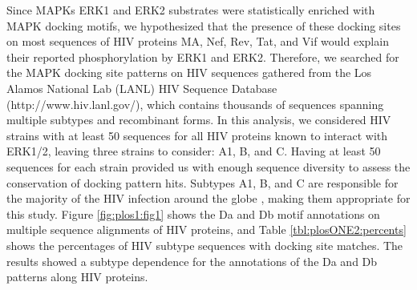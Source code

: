 

Since MAPKs ERK1 and ERK2 substrates were statistically enriched with MAPK
docking motifs, we hypothesized that the presence of these docking
sites on most sequences of HIV proteins MA, Nef, Rev, Tat, and Vif
would explain their reported phosphorylation by ERK1 and
ERK2. Therefore, we searched for the MAPK docking site patterns on HIV
sequences gathered from the Los Alamos National Lab (LANL) HIV
Sequence Database (http://www.hiv.lanl.gov/), which contains thousands
of sequences spanning multiple subtypes and recombinant forms. In this
analysis, we considered HIV strains with at least 50 sequences for all
HIV proteins known to interact with ERK1/2, leaving three strains to
consider: A1, B, and C. Having at least 50 sequences for each strain
provided us with enough sequence diversity to assess the conservation
of docking pattern hits. Subtypes A1, B, and C are responsible for the
majority of the HIV infection around the globe \cite{hemelarr06},
making them appropriate for this study. Figure \ref{fig:plos1:fig1}
shows the Da and Db motif annotations on multiple sequence alignments
of HIV proteins, and Table \ref{tbl:plosONE2:percents} shows the
percentages of HIV subtype sequences with docking site matches. The
results showed a subtype dependence for the annotations of the Da and
Db patterns along HIV proteins.

